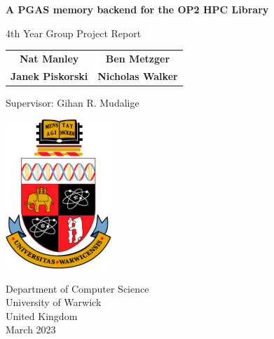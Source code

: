 \begin{titlepage}
   \begin{center}
       \vspace*{1cm}

       \textbf{\Large A PGAS memory backend for the OP2 HPC Library}

       \vspace{0.5cm}
        {\large4th Year Group Project Report}
            
       \vspace{1.5cm}

    \begin{tabular}{cc}
         \textbf{Nat Manley} & \textbf{Ben Metzger}\\
         \textbf{Janek Piskorski} & \textbf{Nicholas Walker}
    \end{tabular}
    
    \vspace{0.5cm}
    
    Supervisor: Gihan R. Mudalige
            
            
       \vspace{2cm}
     
       \includegraphics[width=0.3\textwidth]{WarwickCrest.pdf}
            
       Department of Computer Science\\
       University of Warwick\\
       United Kingdom\\
       March 2023
            
   \end{center}
\end{titlepage}